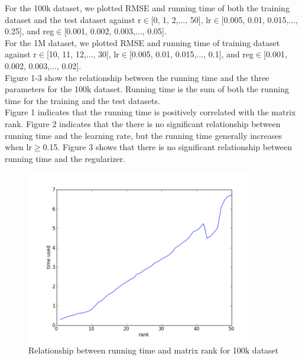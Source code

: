 \documentclass[12pt]{article}
\begin{document}
\noindent For the 100k dataset, we plotted RMSE and running time of both the training dataset
and the test dataset against r$\in$[0, 1, 2,..., 50], lr$\in$[0.005, 0.01, 0.015,..., 0.25], 
and reg$\in$[0.001, 0.002, 0.003,..., 0.05].\\

\noindent For the 1M dataset, we plotted RMSE and running time of training dataset 
against r$\in$[10, 11, 12,..., 30], lr$\in$[0.005, 0.01, 0.015,..., 0.1], and
reg$\in$[0.001, 0.002, 0.003,..., 0.02].\\

\noindent Figure 1-3 show the relationship between the running time and the three parameters
for the 100k dataset. Running time is the sum of both the running time for the training and
the test datasets. \\

\noindent Figure 1 indicates that the running time is positively correlated
with the matrix rank. Figure 2 indicates that the there is no significant relationship between
running time and the learning rate, but the running time generally increases when lr$\geq$0.15.
Figure 3 shows that there is no significant relationship between running time and
the regularizer.

\begin{figure}[H]
\centering
\includegraphics[width=0.90\textwidth]{smalltimerank.png}
\caption{Relationship between running time and matrix rank for 100k dataset}
\end{figure}
\end{document}
